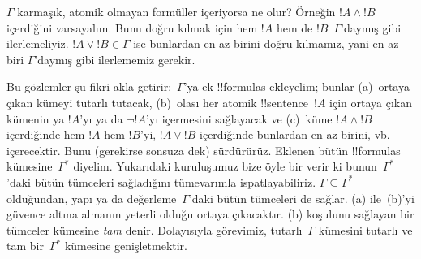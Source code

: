 \documentclass[../../../include/open-logic-section]{subfiles}
\begin{document}
$\Gamma$ karmaşık, atomik olmayan formüller içeriyorsa ne olur?
Örneğin $!A\land !B$ içerdiğini varsayalım. Bunu doğru kılmak için hem
$!A$ hem de $!B$~$\Gamma$'daymış gibi ilerlemeliyiz. $!A\lor !B\in
\Gamma$ ise bunlardan en az birini doğru kılmamız, yani en az biri
$\Gamma$'daymış gibi ilerlememiz gerekir.

Bu gözlemler şu fikri akla getirir:~$\Gamma$'ya ek !!{formula}s
ekleyelim; bunlar (a)~ortaya çıkan kümeyi tutarlı tutacak,
(b)~olası her atomik !!{sentence}~$!A$ için ortaya çıkan
kümenin ya $!A$'yı ya da $\lnot !A$'yı içermesini sağlayacak ve
(c)~küme $!A\land !B$ içerdiğinde hem $!A$ hem $!B$'yi, $!A\lor !B$
içerdiğinde bunlardan en az birini, vb. içerecektir. Bunu (gerekirse
sonsuza dek) sürdürürüz.
Eklenen bütün !!{formula}s kümesine~$\Gamma^*$ diyelim. Yukarıdaki
kuruluşumuz bize öyle bir
verir ki bunun~$\Gamma^*$'daki bütün tümceleri sağladığını tümevarımla
ispatlayabiliriz. $\Gamma\subseteq\Gamma^*$ olduğundan, yapı ya da
değerleme~$\Gamma$'daki bütün tümceleri de sağlar. (a) ile~(b)'yi
güvence altına almanın yeterli olduğu ortaya çıkacaktır. (b) koşulunu
sağlayan bir tümceler kümesine \emph{tam} denir. Dolayısıyla görevimiz,
tutarlı~$\Gamma$ kümesini tutarlı ve tam bir~$\Gamma^*$ kümesine
genişletmektir.
\end{document}
